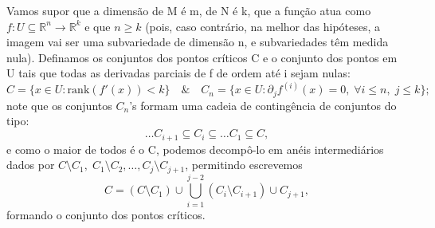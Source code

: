 \documentclass[../differential_topology.tex]{subfiles}
\begin{document}
\begin{proof*}
	Vamos supor que a dimensão de M é m, de N é k, que a função atua como \(f:U\subseteq \mathbb{R}^{n}\rightarrow \mathbb{R}^{k}\) e que \(n\geq k\) (pois, caso contrário, na melhor das hipóteses, a imagem vai ser uma subvariedade de dimensão n, e subvariedades têm medida nula).
	Definamos os conjuntos dos pontos críticos C e o conjunto dos pontos em U tais que todas as derivadas parciais de f de ordem até i sejam nulas:
	\[
		C = \{x\in U: \mathrm{rank}(f'(x)) < k\} \quad\&\quad C_{n} = \{x\in U: \partial_{j}f^{(i)}(x) = 0,\; \forall i \leq n,\; j\leq k\};
	\]
	note que os conjuntos \(C_{n}\)'s formam uma cadeia de contingência de conjuntos do tipo:
	\[
		\dotsc C_{i+1}\subseteq C_{i}\subseteq \dotsc C_{1} \subseteq C,
	\]
	e como o maior de todos é o C, podemos decompô-lo em anéis intermediários dados por \(C\setminus{C_1},\; C_1\setminus{C_2}, \dotsc , C_{j}\setminus{C_{j+1}}\), permitindo escrevemos
	\[
		C = (C\setminus{C_1})\cup \bigcup_{i=1}^{j-2}(C_{i}\setminus{C_{i+1}})\cup C_{j+1},
	\]
	formando o conjunto dos pontos críticos.


\end{proof*}
\end{document}
